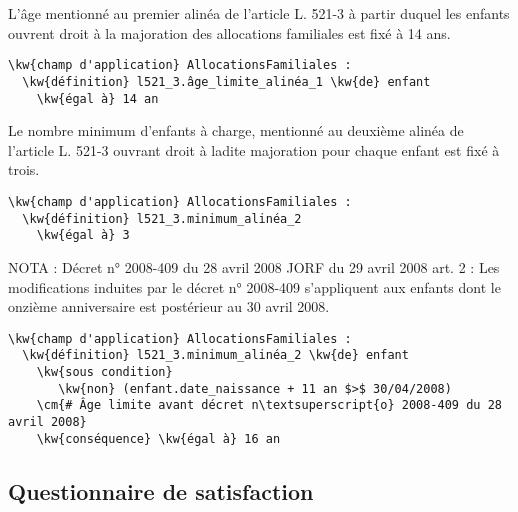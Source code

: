 \documentclass[12pt, french]{article}
\providecommand{\cm}[1]{\textit{\texttt{\textcolor{PineGreen}{#1}}}}
\newcommand{\kw}[1]{\textbf{\textcolor{OliveGreen}{#1}}}
\begin{document}
L'âge mentionné au premier alinéa de l'article L. 521-3 à partir duquel les enfants ouvrent droit à la majoration des allocations familiales est fixé à 14 ans.
\begin{Verbatim}
\kw{champ d'application} AllocationsFamiliales :
  \kw{définition} l521_3.âge_limite_alinéa_1 \kw{de} enfant
    \kw{égal à} 14 an
\end{Verbatim}

Le nombre minimum d'enfants à charge, mentionné au deuxième alinéa de l'article L. 521-3 ouvrant droit à ladite majoration pour chaque enfant est fixé à trois.
\begin{Verbatim}
\kw{champ d'application} AllocationsFamiliales :
  \kw{définition} l521_3.minimum_alinéa_2
    \kw{égal à} 3
\end{Verbatim}


NOTA : Décret n° 2008-409 du 28 avril 2008 JORF du 29 avril 2008 art. 2 : Les modifications induites par le décret n° 2008-409 s'appliquent aux enfants dont le onzième anniversaire est postérieur au 30 avril 2008.

\begin{Verbatim}
\kw{champ d'application} AllocationsFamiliales :
  \kw{définition} l521_3.minimum_alinéa_2 \kw{de} enfant
    \kw{sous condition}
       \kw{non} (enfant.date_naissance + 11 an $>$ 30/04/2008)
    \cm{# Âge limite avant décret n\textsuperscript{o} 2008-409 du 28 avril 2008}
    \kw{conséquence} \kw{égal à} 16 an
\end{Verbatim}

\subsection{Questionnaire de satisfaction}


\end{document}
